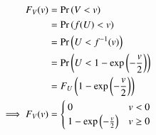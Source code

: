 \documentclass[journal,12pt,twocolumn]{IEEEtran}
\renewcommand\thesection{\arabic{section}}
\begin{document}
\begin{enumerate}[label=\thesection.\arabic*
,ref=\thesection.\theenumi]
		\begin{align}
			F_V(v) &= \Pr\left(V < v\right)\\
			&= \Pr\left(f(U) < v\right)\\
			&= \Pr\left(U < f^{-1}(v)\right)\\
			&= \Pr\left(U < 1 - \exp{\left(-\frac{v}{2}\right)}\right)\\
			&= F_U\left(1 - \exp{\left(-\frac{v}{2}\right)}\right) \\
			\implies F_V(v) &= 
			\begin{cases}
				0 & v < 0 \\
				1 - \exp{\left(-\frac{v}{2}\right)} & v \geq 0
			\end{cases}
		\end{align}

\end{enumerate}
\end{document}
